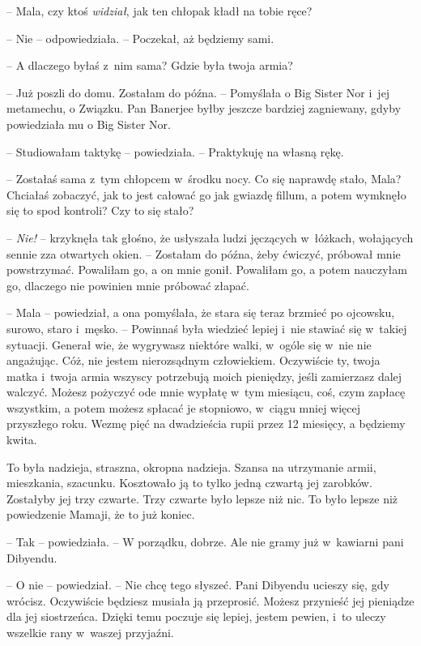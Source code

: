 \documentclass[oneside,polish,11pt,rmheadings]{mwbk}
\begin{document}
-- Mala, czy ktoś \textit{widział}, jak ten chłopak kładł na tobie ręce? 


-- Nie -- odpowiedziała. -- Poczekał, aż będziemy sami. 


-- A dlaczego byłaś z~nim sama? Gdzie była twoja armia? 


-- Już poszli do domu. Zostałam do późna. -- Pomyślała o Big Sister Nor i~jej metamechu, o Związku. Pan Banerjee byłby jeszcze bardziej zagniewany, gdyby powiedziała mu o Big Sister Nor. 

-- Studiowałam taktykę -- powiedziała. -- Praktykuję na własną rękę. 


-- Zostałaś sama z~tym chłopcem w~środku nocy. Co się naprawdę stało, Mala? Chciałaś zobaczyć, jak to jest całować go jak gwiazdę fillum, a potem wymknęło się to spod kontroli? Czy to się stało? 


-- \textit{Nie!} -- krzyknęła tak głośno, że usłyszała ludzi jęczących w~łóżkach, wołających sennie zza otwartych okien. -- Zostałam do późna, żeby ćwiczyć, próbował mnie powstrzymać. Powaliłam go, a on mnie gonił. Powaliłam go, a potem nauczyłam go, dlaczego nie powinien mnie próbować złapać. 


-- Mala -- powiedział, a ona pomyślała, że stara się teraz brzmieć po ojcowsku, surowo, staro i~męsko. -- Powinnaś była wiedzieć lepiej i~nie stawiać się w~takiej sytuacji. Generał wie, że wygrywasz niektóre walki, w~ogóle się w~nie nie angażując. Cóż, nie jestem nierozsądnym człowiekiem. Oczywiście ty, twoja matka i~twoja armia wszyscy potrzebują moich pieniędzy, jeśli zamierzasz dalej walczyć. Możesz pożyczyć ode mnie wypłatę w~tym miesiącu, coś, czym zapłacę wszystkim, a potem możesz spłacać je stopniowo, w~ciągu mniej więcej przyszłego roku. Wezmę pięć na dwadzieścia rupii przez 12 miesięcy, a będziemy kwita. 


To była nadzieja, straszna, okropna nadzieja. Szansa na utrzymanie armii, mieszkania, szacunku. Kosztowało ją to tylko jedną czwartą jej zarobków. Zostałyby jej trzy czwarte. Trzy czwarte było lepsze niż nic. To było lepsze niż powiedzenie Mamaji, że to już koniec. 


-- Tak -- powiedziała. -- W porządku, dobrze. Ale nie gramy już w~kawiarni pani Dibyendu. 


-- O nie -- powiedział. -- Nie chcę tego słyszeć. Pani Dibyendu ucieszy się, gdy wrócisz. Oczywiście będziesz musiała ją przeprosić. Możesz przynieść jej pieniądze dla jej siostrzeńca. Dzięki temu poczuje się lepiej, jestem pewien, i~to uleczy wszelkie rany w~waszej przyjaźni. 
\end{document}

